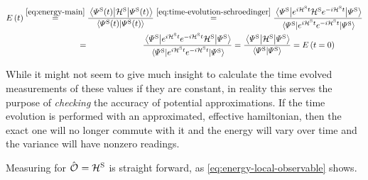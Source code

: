\begin{equation}
    \label{eq:energy-conserved}
    \begin{split}
        \energyOft &\stackrel{\ref{eq:energy-main}}{=}
        \frac{\bracketHelper{\psiOfT[\schroedingerPicture]}{\pictureHamiltonian[\schroedingerPicture]}{\psiOfT[\schroedingerPicture]}}{\braketHelper{\psiOfT[\schroedingerPicture]}{\psiOfT[\schroedingerPicture]}}
        \stackrel{\ref{eq:time-evolution-schroedinger}}{=}
        \frac{\bracketHelper{\picturePsi[\schroedingerPicture]{}}{e^{i \pictureHamiltonian[\schroedingerPicture] t}{\pictureHamiltonian[\schroedingerPicture]}e^{-i \pictureHamiltonian[\schroedingerPicture] t}}{\picturePsi[\schroedingerPicture]{}}}{\bracketHelper{\picturePsi[\schroedingerPicture]{}}{e^{i \pictureHamiltonian[\schroedingerPicture] t}e^{-i \pictureHamiltonian[\schroedingerPicture] t}}{\picturePsi[\schroedingerPicture]{}}}\\
        &\stackrel{\phantom{\ref{eq:time-evolution-schroedinger}}}{=}
        \frac{\bracketHelper{\picturePsi[\schroedingerPicture]{}}{e^{i \pictureHamiltonian[\schroedingerPicture] t}e^{-i \pictureHamiltonian[\schroedingerPicture] t}{\pictureHamiltonian[\schroedingerPicture]}}{\picturePsi[\schroedingerPicture]{}}}{\bracketHelper{\picturePsi[\schroedingerPicture]{}}{e^{i \pictureHamiltonian[\schroedingerPicture] t}e^{-i \pictureHamiltonian[\schroedingerPicture] t}}{\picturePsi[\schroedingerPicture]{}}} = 
        \frac{\bracketHelper{\picturePsi[\schroedingerPicture]{}}{\pictureHamiltonian[\schroedingerPicture]}{\picturePsi[\schroedingerPicture]{}}}{\braketHelper{\picturePsi[\schroedingerPicture]{}}{\picturePsi[\schroedingerPicture]{}}}
         = \energyOft[t=0]
    \end{split}
\end{equation}

While it might not seem to give much insight to calculate the time evolved measurements of these values if they are constant, in reality this serves the purpose of \emph{checking} the accuracy of potential approximations.
If the time evolution is performed with an approximated, effective hamiltonian, then the exact one will no longer commute with it and the energy will vary over time and the variance will have nonzero readings.

Measuring  for $\ObservableOp = \pictureHamiltonian[\schroedingerPicture]$ is straight forward, as \autoref{eq:energy-local-observable} shows.


